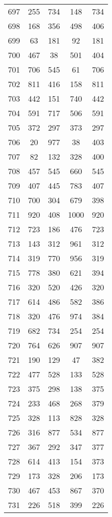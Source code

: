 \documentclass[a4paper,10pt,ngerman]{scrartcl}
\begin{document}
\begin{longtable}[c]{c|c|c|c|c}
    697 & 255 & 734 & 148 & 734 \\
    698 & 168 & 356 & 498 & 406 \\
    699 & 63 & 181 & 92 & 181 \\
    700 & 467 & 38 & 501 & 404 \\
    701 & 706 & 545 & 61 & 706 \\
    702 & 811 & 416 & 158 & 811 \\
    703 & 442 & 151 & 740 & 442 \\
    704 & 591 & 717 & 506 & 591 \\
    705 & 372 & 297 & 373 & 297 \\
    706 & 20 & 977 & 38 & 403 \\
    707 & 82 & 132 & 328 & 400 \\
    708 & 457 & 545 & 660 & 545 \\
    709 & 407 & 445 & 783 & 407 \\
    710 & 700 & 304 & 679 & 398 \\
    711 & 920 & 408 & 1000 & 920 \\
    712 & 723 & 186 & 476 & 723 \\
    713 & 143 & 312 & 961 & 312 \\
    714 & 319 & 770 & 956 & 319 \\
    715 & 778 & 380 & 621 & 394 \\
    716 & 320 & 520 & 426 & 320 \\
    717 & 614 & 486 & 582 & 386 \\
    718 & 320 & 476 & 974 & 384 \\
    719 & 682 & 734 & 254 & 254 \\
    720 & 764 & 626 & 907 & 907 \\
    721 & 190 & 129 & 47 & 382 \\
    722 & 477 & 528 & 133 & 528 \\
    723 & 375 & 298 & 138 & 375 \\
    724 & 233 & 468 & 268 & 379 \\
    725 & 328 & 113 & 828 & 328 \\
    726 & 316 & 877 & 534 & 877 \\
    727 & 367 & 292 & 347 & 377 \\
    728 & 614 & 413 & 154 & 373 \\
    729 & 173 & 328 & 206 & 173 \\
    730 & 467 & 453 & 867 & 370 \\
    731 & 226 & 518 & 399 & 226 \\

\end{longtable}
\end{document}
